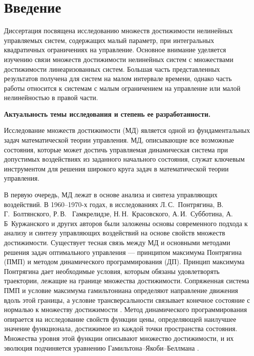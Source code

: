 \documentclass[../main.tex]{subfiles}
\begin{document}
\clearpage
\section*{Введение}
Диссертация посвящена исследованию множеств достижимости нелинейных управляемых систем, содержащих малый параметр, при интегральных квадратичных ограничениях на управление.
Основное внимание уделяется изучению связи множеств достижимости нелинейных систем с множествами достижимости линеаризованных систем. 
Большая часть представленных результатов получена для систем на малом интервале времени, однако часть работы относится к системам с малым ограничением на управление или малой нелинейностью в правой части. 

\textbf{Актуальность темы исследования и степень ее разработанности.} 

Исследование множеств достижимости (МД) является одной из фундаментальных задач математической теории управления. 
МД, описывающие все возможные состояния, которые может достичь управляемая динамическая система при допустимых воздействиях из заданного начального состояния, служат ключевым инструментом для решения широкого круга задач в математической теории управления. 

В первую очередь, МД лежат в основе анализа и синтеза управляющих воздействий. 
В 1960–1970-х годах, в исследованиях Л.\,С.~Понтрягина, В.\,Г.~Болтянского, Р.\,В. ~Гамкрелидзе, Н.\,Н.~Красовского, А.\,И.~Субботина, А.\,Б~Куржанского и других авторов \cite{Boltyansky, Pontryagin1961, Pontryagin1967, Gamkrelidze, Kras_book, KrasSub, Kurzhanski1977} были заложены основы современного подхода к анализу и синтезу управляющих воздействий на основе свойств множеств достижимости.
Существует тесная связь между МД и основными методами решения задач оптимального управления --- принципом максимума Понтрягина (ПМП) и методом динамического программирования (ДП).
Принцип максимума Понтрягина дает необходимые условия, которым обязаны удовлетворять траектории, лежащие на границе множества достижимости. 
Сопряженная система ПМП и условие максимума гамильтониана определяют направление движения вдоль этой границы, а условие трансверсальности связывает конечное состояние с нормалью к множеству достижимости \cite{Pontryagin1961, Lee}.
Метод динамического программирования опирается на исследование свойств функции цены, определяющей наилучшее значение функционала, достижимое из каждой точки пространства состояния. 
Множества уровня этой функции описывают множество достижимости, и их эволюция подчиняется уравнению Гамильтона–Якоби–Беллмана \cite{Bellman, Kurzhanski1977, GurmanDuhta, Mitchell2002, Osher, Sethian}. 
\end{document}
